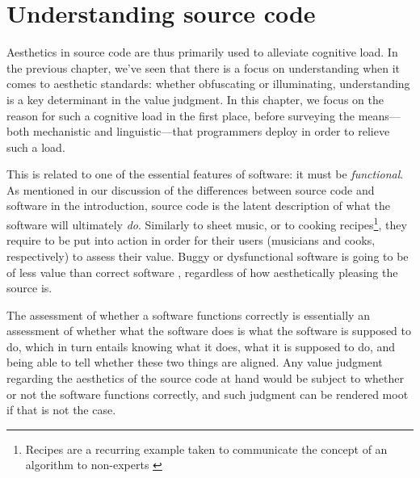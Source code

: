 \chapter{Understanding source code}

Aesthetics in source code are thus primarily used to alleviate cognitive load. In the previous chapter, we've seen that there is a focus on understanding when it comes to aesthetic standards: whether obfuscating or illuminating, understanding is a key determinant in the value judgment. In this chapter, we focus on the reason for such a cognitive load in the first place, before surveying the means—both mechanistic and linguistic—that programmers deploy in order to relieve such a load.

This is related to one of the essential features of software: it must be \emph{functional}. As mentioned in our discussion of the differences between source code and software in the introduction, source code is the latent description of what the software will ultimately \emph{do}. Similarly to sheet music, or to cooking recipes\footnote{Recipes are a recurring example taken to communicate the concept of an algorithm to non-experts \citep{zeller_algorithms_2020}}, they require to be put into action in order for their users (musicians and cooks, respectively) to assess their value. Buggy or dysfunctional software is going to be of less value than correct software \citep{hill_what_2016}, regardless of how aesthetically pleasing the source is.

The assessment of whether a software functions correctly is essentially an assessment of whether what the software does is what the software is supposed to do, which in turn entails knowing what it does, what it is supposed to do, and being able to tell whether these two things are aligned. Any value judgment regarding the aesthetics of the source code at hand would be subject to whether or not the software functions correctly, and such judgment can be rendered moot if that is not the case.

